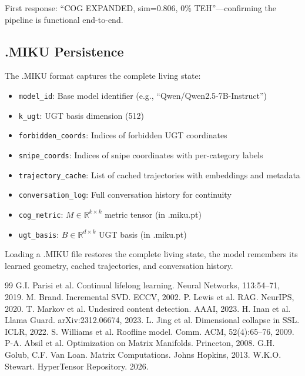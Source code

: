 \documentclass[11pt]{article}
\begin{document}
First response: ``COG EXPANDED, sim=0.806, 0\% TEH''---confirming the pipeline is functional end-to-end.

\subsection{.MIKU Persistence}

The .MIKU format captures the complete living state:
\begin{itemize}[nosep]
\item \texttt{model\_id}: Base model identifier (e.g., ``Qwen/Qwen2.5-7B-Instruct'')
\item \texttt{k\_ugt}: UGT basis dimension (512)
\item \texttt{forbidden\_coords}: Indices of forbidden UGT coordinates
\item \texttt{snipe\_coords}: Indices of snipe coordinates with per-category labels
\item \texttt{trajectory\_cache}: List of cached trajectories with embeddings and metadata
\item \texttt{conversation\_log}: Full conversation history for continuity
\item \texttt{cog\_metric}: $M \in \mathbb{R}^{k \times k}$ metric tensor (in .miku.pt)
\item \texttt{ugt\_basis}: $B \in \mathbb{R}^{d \times k}$ UGT basis (in .miku.pt)
\end{itemize}

Loading a .MIKU file restores the complete living state, the model remembers its learned geometry, cached trajectories, and conversation history.

\clearpage
\begin{thebibliography}{99}
 G.I. Parisi et al. Continual lifelong learning. Neural Networks, 113:54--71, 2019.
 M. Brand. Incremental SVD. ECCV, 2002.
 P. Lewis et al. RAG. NeurIPS, 2020.
 T. Markov et al. Undesired content detection. AAAI, 2023.
 H. Inan et al. Llama Guard. arXiv:2312.06674, 2023.
 L. Jing et al. Dimensional collapse in SSL. ICLR, 2022.
 S. Williams et al. Roofline model. Comm. ACM, 52(4):65--76, 2009.
 P-A. Absil et al. Optimization on Matrix Manifolds. Princeton, 2008.
 G.H. Golub, C.F. Van Loan. Matrix Computations. Johns Hopkins, 2013.
 W.K.O. Stewart. HyperTensor Repository. 2026.
\end{thebibliography}
\end{document}
